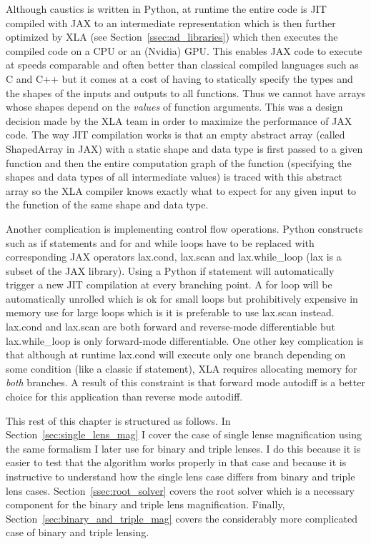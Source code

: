 \documentclass[12pt,dvipsnames]{report}
\newcommand{\ssf}[1]{\textsf{#1}}
\begin{document}
Although \ssf{caustics} is written in \ssf{Python}, at runtime the entire code
is JIT compiled with \ssf{JAX} to an intermediate representation which is then
further optimized by \ssf{XLA} (see Section~\ref{ssec:ad_libraries}) which then
executes the compiled code on a CPU or an (Nvidia) GPU. This enables \ssf{JAX}
code to execute at speeds comparable and often better than classical compiled
languages such as \ssf{C} and \ssf{C++} but it comes at a cost of having to
statically specify the types and the shapes of the inputs and outputs to all
functions. Thus we cannot have arrays whose shapes depend on the \emph{values}
of function arguments. This was a design decision made by the \ssf{XLA} team in
order to maximize the performance of \ssf{JAX} code. The way JIT compilation
works is that an empty abstract array (called \ssf{ShapedArray} in \ssf{JAX})
with a static shape and data type is first passed to a given function and then
the entire computation graph of the function (specifying the shapes and data
types of all intermediate values) is traced with this abstract array so the XLA
compiler knows exactly what to expect for any given input to the function of
the same shape and data type.

Another complication is implementing control flow operations. \ssf{Python}
constructs such as \ssf{if} statements and \ssf{for} and \ssf{while} loops have
to be replaced with corresponding \ssf{JAX} operators \ssf{lax.cond},
\ssf{lax.scan} and \ssf{lax.while\_loop} (\ssf{lax} is a subset of the
\ssf{JAX} library). Using a \ssf{Python} \ssf{if} statement will automatically
trigger a new JIT compilation at every branching point. A \ssf{for} loop will
be automatically unrolled which is ok for small loops but prohibitively
expensive in memory use for large loops which is it is preferable to use
\ssf{lax.scan} instead. \ssf{lax.cond} and \ssf{lax.scan} are both forward and
reverse-mode differentiable but \ssf{lax.while\_loop} is only forward-mode
differentiable. One other key complication is that although at runtime
\ssf{lax.cond} will execute only one branch depending on some condition (like a
classic \ssf{if} statement), XLA requires allocating memory for \emph{both}
branches. A result of this constraint is that forward mode autodiff is a better
choice for this application than reverse mode autodiff.

This rest of this chapter is structured as follows. In
Section~\ref{sec:single_lens_mag} I cover the case of single lense
magnification using the same formalism I later use for binary and triple
lenses. I do this because it is easier to test that the algorithm works
properly in that case and because it is instructive to understand how the
single lens case differs from binary and triple lens cases.
Section~\ref{ssec:root_solver} covers the root solver which is a necessary
component for the binary and triple lens magnification. Finally,
Section~\ref{sec:binary_and_triple_mag} covers the considerably more
complicated case of binary and triple lensing.
\end{document}
